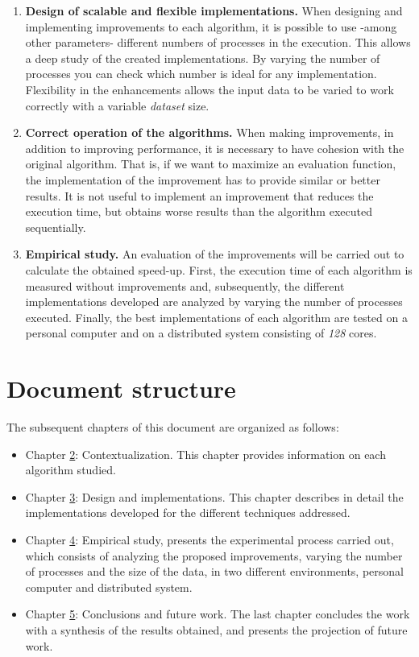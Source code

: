 \begin{enumerate}		
	\item \textbf{Design of scalable and flexible implementations.} When designing and implementing improvements to each algorithm, it is possible to use -among other parameters- different numbers of processes in the execution. This allows a deep study of the created implementations. By varying the number of processes you can check which number is ideal for any implementation. Flexibility in the enhancements allows the input data to be varied to work correctly with a variable \textit{dataset} size.
	\item \textbf{Correct operation of the algorithms.} When making improvements, in addition to improving performance, it is necessary to have cohesion with the original algorithm. That is, if we want to maximize an evaluation function, the implementation of the improvement has to provide similar or better results. It is not useful to implement an improvement that reduces the execution time, but obtains worse results than the algorithm executed sequentially.
	\item \textbf{Empirical study.} An evaluation of the improvements will be carried out to calculate the obtained speed-up. First, the execution time of each algorithm is measured without improvements and, subsequently, the different implementations developed are analyzed by varying the number of processes executed. Finally, the best implementations of each algorithm are tested on a personal computer and on a distributed system consisting of \textit{128} cores.
\end{enumerate}





\section{Document structure}
The subsequent chapters of this document are organized as follows:	
\begin{itemize}		
	\item Chapter \hyperref[cap:c2_context]{2}: Contextualization. This chapter provides information on each algorithm studied.
	\item Chapter \hyperref[cap:c3_implementaciones]{3}: Design and implementations. This chapter describes in detail the implementations developed for the different techniques addressed.
	\item Chapter \hyperref[cap:c4_estudio]{4}: Empirical study, presents the experimental process carried out, which consists of analyzing the proposed improvements, varying the number of processes and the size of the data, in two different environments, personal computer and distributed system.
	\item Chapter \hyperref[cap:c5_conclu]{5}: Conclusions and future work. The last chapter concludes the work with a synthesis of the results obtained, and presents the projection of future work.
\end{itemize}


